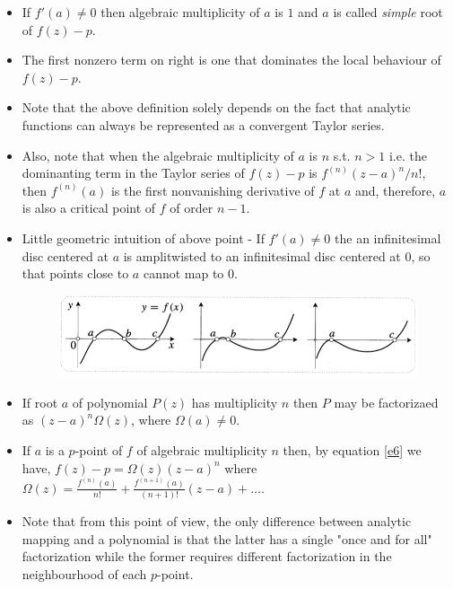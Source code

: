 \documentclass[12pt]{article}
\def\tt{\textit}
\begin{document}
\begin{itemize} 
    \item If $f'(a)\neq 0$ then algebraic multiplicity of $a$ is $1$ and $a$ is called \tt{simple} root of $f(z)-p$.
    \item The first nonzero term on right is one that dominates the local behaviour of $f(z)-p$.
    \item Note that the above definition solely depends on the fact that analytic functions can always be represented as a convergent Taylor series.
    \item Also, note that when the algebraic multiplicity of $a$ is $n$ s.t. $n>1$ i.e. the dominanting term in the Taylor series of $f(z)-p$ is $f^{(n)}(z-a)^{n}/n!$, then $f^{(n)}(a)$ is the first nonvanishing derivative of $f$ at $a$ and, therefore, $a$ is also a critical point of $f$ of order $n-1$.
    \item Little geometric intuition of above point - If $f'(a)\neq 0$ the an infinitesimal disc centered at $a$ is amplitwisted to an infinitesimal disc centered at $0$, so that points close to $a$ cannot map to $0$.
    \begin{figure}[h!]
        \centering
        \includegraphics[scale=0.7]{fig_6}
        \label{f6}
    \end{figure}
    \item If root $a$ of polynomial $P(z)$ has multiplicity $n$ then $P$ may be factorizaed as $(z-a)^n\Omega(z)$, where $\Omega(a)\neq 0$.
    \item If $a$ is a $p$-point of $f$ of algebraic multiplicity $n$ then, by equation \eqref{e6} we have, $f(z)-p = \Omega(z)(z-a)^n$ where $\Omega(z) = \frac{f^{(n)}(a)}{n!} + \frac{f^{(n+1)}(a)}{(n+1)!}(z-a) + \ldots$.
    \item Note that from this point of view, the only difference between analytic mapping and a polynomial is that the latter has a single "once and for all" factorization while the former requires different factorization in the neighbourhood of each $p$-point.
\end{itemize}
\end{document}

